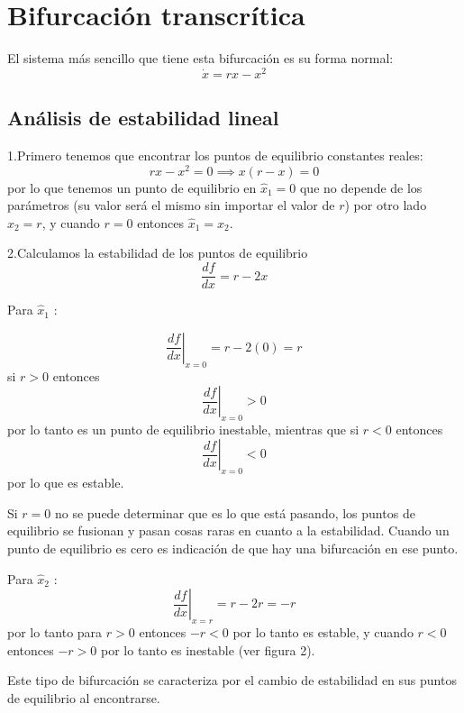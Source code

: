 
\section{Bifurcación transcrítica}

El sistema más sencillo que tiene esta bifurcación es su forma normal:
  $$
\dot{x} = rx-x^2
$$
\subsection*{Análisis de estabilidad lineal}

1.Primero tenemos que encontrar los puntos de equilibrio constantes reales:
$$
rx-x^2=0 \implies x(r-x)=0
$$
por lo que tenemos un punto de equilibrio en $\hat{x}_1=0$ que no depende de los parámetros (su valor será el mismo sin importar el valor de $r$)
por otro lado $\hat{x}_2=r$, y cuando $ r=0 $ entonces  $\hat{x}_1=\hat{x}_2$.

2.Calculamos la estabilidad de los puntos de equilibrio
$$ \frac{df}{dx}=r-2x $$

Para $\hat{x}_1$ :

$$  \left. \frac{df}{dx}  \right|_{x=0}=r-2(0)=r  $$
si $r>0$ entonces $$
\left. \frac{df}{dx} \right|_{x=0}>0 
$$
por lo tanto es un punto de equilibrio inestable, mientras que si $r<0$ entonces
 $$
\left. \frac{df}{dx} \right|_{x=0}<0
$$
por lo que es estable.

\begin{tcolorbox}[colback=Black!4, colframe=White, arc=2mm]
\begin{nota}
  Si $r=0$ no se puede determinar que es lo que está pasando, los puntos de equilibrio se fusionan y pasan cosas raras en cuanto a la estabilidad. Cuando un punto de equilibrio es cero es indicación de que hay una bifurcación en ese punto.

\end{nota}
\end{tcolorbox}

Para $\hat{x}_2$ :
$$
\left. \frac{df}{dx} \right|_{x=r} = r-2r=-r
$$
por lo tanto para $r>0$ entonces  $-r<0$ por lo tanto es estable, y cuando  $r<0$ entonces $-r>0$ por lo tanto es inestable (ver figura 2).
\vspace{2mm}
\begin{tcolorbox}[colback=Black!4, colframe=White, arc=2mm]
\begin{nota}
  Este tipo de bifurcación se caracteriza por el cambio de estabilidad en sus puntos de equilibrio al encontrarse.
\end{nota}
\end{tcolorbox}
\vspace{2mm}

